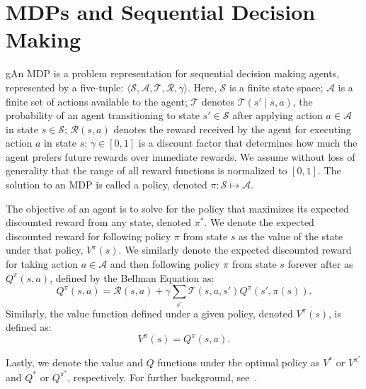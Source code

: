 \section{\acp{MDP} and Sequential Decision Making}



gAn \ac{MDP} is a problem representation for sequential decision making agents, represented by a five-tuple: $\langle \mathcal{S}, \mathcal{A}, \mathcal{T}, \mathcal{R}, \gamma \rangle$. Here, $\mathcal{S}$ is a finite state space; $\mathcal{A}$ is a finite set of actions available to the agent; $\mathcal{T}$ denotes $\mathcal{T}(s' \mid s,a)$, the probability of an agent transitioning to state $s' \in \mathcal{S}$ after applying action $a \in \mathcal{A}$ in state $s \in \mathcal{S}$; $\mathcal{R}(s,a)$ denotes the reward received by the agent for executing action $a$ in state $s$; $\gamma \in [0, 1]$ is a discount factor that determines how much the agent prefers future rewards over immediate rewards. We assume without loss of generality that the range of all reward functions is normalized to $[0,1]$. The solution to an \ac{MDP} is called a policy, denoted $\pi: \mathcal{S} \mapsto \mathcal{A}$.

The objective of an agent is to solve for the policy that maximizes its expected discounted reward from any state, denoted $\pi^*$. We denote the expected discounted reward for following policy $\pi$ from state $s$ as the value of the state under that policy, $V^\pi(s)$. We similarly denote the expected discounted reward for taking action $a \in \mathcal{A}$ and then following policy $\pi$ from state $s$ forever after as $Q^\pi(s,a)$, defined by the Bellman Equation as:
\begin{equation}
Q^\pi(s,a) = \mathcal{R}(s,a) + \gamma \sum_{s'} \mathcal{T}(s,a,s') Q^\pi(s',\pi(s)).
\end{equation}
Similarly, the value function defined under a given policy, denoted $V^\pi(s)$, is defined as:
\begin{equation}
V^\pi(s) = Q^\pi(s,a).
\end{equation}


Lastly, we denote the value and $Q$ functions under the optimal policy as $V^*$ or $V^{\pi^*}$ and $Q^*$ or $Q^{\pi^*}$, respectively. For further background, see~\citet{kaelbling1996reinforcement}.

